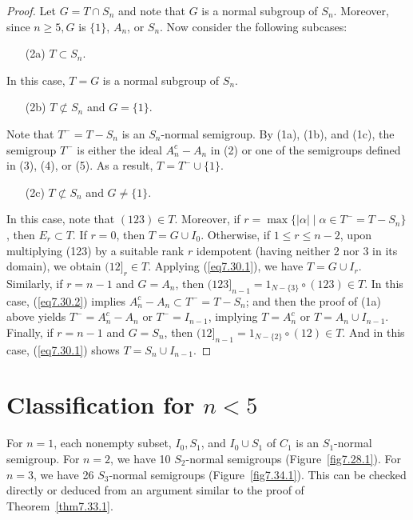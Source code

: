 \documentclass{surv-l}
\numberwithin{equation}{section}
\numberwithin{table}{section}
\numberwithin{figure}{section}
\theoremstyle{definition}
\begin{document}
\begin{proof}
\noindent Let $G=T\cap S_{n}$ and note that $G$ is a normal subgroup of
$S_{n}$. Moreover, since $n \geq 5, G$ is $\{1\}$, $A_{n}$, or
$S_{n}$. Now consider the following subcases:
\begin{enumerate}
\item[(2a)] $T\subset S_{n}$.
\end{enumerate}
In this case, $T=G$ is a normal subgroup of $S_{n}$.
\begin{enumerate}
\item[(2b)] $T\not\subset S_{n}$ and $G=\{1\}$.
\end{enumerate}
Note that $T^{-}=T-S_{n}$ is an $S_{n}$-normal semigroup. By (1a),
(1b), and (1c), the semigroup $T^{-}$ is either the ideal
$A_{n}^{c}-A_{n}$ in (2) or one of the semigroups defined in (3),
(4), or (5). As a result, $T=T^{-}\cup\{1\}$.
\begin{enumerate}
\item[(2c)] $T\not\subset S_{n}$ and $G\neq\{1\}$.
\end{enumerate}
In this case, note that $(123) \in T$. Moreover, if
$r=\max\{|\alpha|\mid \alpha\in T^{-}= T-S_{n}\}$, then
$E_{r}\subset T$. If $r=0$, then $T=G\cup I_{0}$. Otherwise, if
$1\leq r\leq n-2$, upon multiplying (123) by a suitable rank $r$
idempotent (having neither 2 nor 3 in its domain), we obtain
$(12]_{r}\in T$. Applying (\ref{eq7.30.1}), we have $T=G\cup
I_{r}$. Similarly, if $r=n-1$ and $G=A_{n}$, then
$(123]_{n-1}=1_{N-\{3\}}\circ (123)\in T$. In this case,
(\ref{eq7.30.2}) implies $A_{n}^{c}-A_{n}\subset T^{-}=T-S_{n}$;
and then the proof of (1a) above yields $T^{-}=A_{n}^{c}-A_{n}$ or
$T^{-}=I_{n-1}$, implying $T=A_{n}^{c}$ or $T= A_{n}\cup I_{n-1}$.
Finally, if $r=n-1$ and $G=S_{n}$, then $(12]_{n-1}=1_{N-\{2\}}\circ
(12) \in T$. And in this case, (\ref{eq7.30.1}) shows $T=S_{n}\cup
I_{n-1}.$
\end{proof}

\section{Classification for $n <5$}\label{sec7.34}

For $n=1$, each nonempty subset, $I_{0}, S_{1}$, and $I_{0}\cup
S_{1}$ of $C_{1}$ is an $S_{1}$-normal semigroup. For $n =2$, we
have 10 $S_{2}$-normal semigroups (Figure~\ref{fig7.28.1}). For $n
=3$, we have 26 $S_{3}$-normal semigroups
(Figure~\ref{fig7.34.1}). This can be checked directly or deduced
from an argument similar to the proof of Theorem~\ref{thm7.33.1}.
\end{document}
